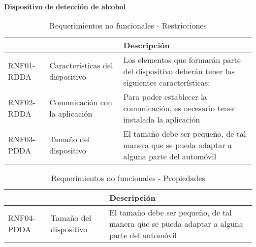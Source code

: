 \textbf{Dispositivo de detección de alcohol}
\begin{center}
\begin{table}[!htb]
\centering
\begin{tabular}{|p{4cm}|p{4cm}|p{5cm}|}
    \hline
    \centering {\bfseries }  & \centering {\bfseries Nombre} & {\bfseries Descripción} \\ \hline
    \centering RNF01-RDDA & \centering Características del dispositivo & Los elementos que formarán parte del dispositivo deberán tener las siguientes características: \\ \hline
    \centering RNF02-RDDA & \centering Comunicación con la aplicación & Para poder establecer la comunicación, es necesario tener instalada la aplicación \\ \hline
    \centering RNF03-PDDA & \centering Tamaño del dispositivo & El tamaño debe ser pequeño, de tal manera que se pueda adaptar a alguna parte del automóvil \\ \hline
\end{tabular}
\caption{Requerimientos no funcionales - Restricciones}
\label{tabla:pobconlimsincolo}
\end{table}
\end{center}

\begin{center}
\begin{table}[!htb]
\centering
\begin{tabular}{|p{4cm}|p{4cm}|p{5cm}|}
    \hline
    \centering {\bfseries }  & \centering {\bfseries Nombre} & {\bfseries Descripción} \\ \hline
    \centering RNF04-PDDA & \centering Tamaño del dispositivo & El tamaño debe ser pequeño, de tal manera que se pueda adaptar a alguna parte del automóvil \\ \hline
\end{tabular}
\caption{Requerimientos no funcionales - Propiedades}
\label{tabla:pobconlimsincolo}
\end{table}
\end{center}
